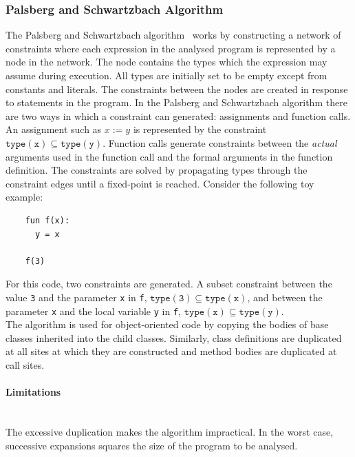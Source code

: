 \documentclass[12pt, titlepage]{article}
\begin{document}
\subsubsection{Palsberg and Schwartzbach Algorithm}
The Palsberg and Schwartzbach algorithm~\cite{Palsbergstatictyping} works by constructing a network of constraints where each expression in the analysed program is represented by a node in the network. The node contains the types which the expression may assume during execution. All types are initially set to be empty except from constants and literals. The constraints between the nodes are created in response to statements in the program. In the Palsberg and Schwartzbach algorithm there are two ways in which a constraint can generated: assignments and function calls. An assignment such as $x := y$ is represented by the constraint $\mathtt{type(x) \subseteq type(y)}$. Function calls generate constraints between the \textit{actual} arguments used in the function call and the formal arguments in the function definition. The constraints are solved by propagating types through the constraint edges until a fixed-point is reached. Consider the following toy example: 
\begin{lstlisting}
    fun f(x):
      y = x
      
    f(3)
\end{lstlisting}
For this code, two constraints are generated. A subset constraint between the value \texttt{3} and the parameter \texttt{x} in \texttt{f}, $\mathtt{type(3) \subseteq type(x)}$, and between the parameter \texttt{x} and the local variable \texttt{y} in \texttt{f}, $\mathtt{type(x) \subseteq type(y)}$.  \\
\indent The algorithm is used for object-oriented code by copying the bodies of base classes inherited into the child classes. Similarly, class definitions are duplicated at all sites at which they are constructed and method bodies are duplicated at call sites.
\paragraph*{Limitations}\mbox{}\\
The excessive duplication makes the algorithm impractical. In the worst case, successive expansions squares the size of the program to be analysed.
\end{document}
